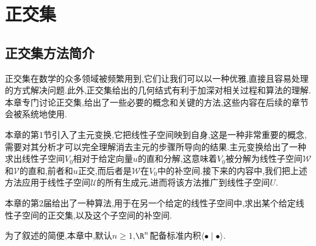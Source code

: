 \chapter{正交集}

\section{正交集方法简介}

正交集在数学的众多领域被频繁用到,它们让我们可以以一种优雅,直接且容易处理的方式解决问题.此外,正交集给出的几何结式有利于加深对相关过程和算法的理解.本章专门讨论正交集,给出了一些必要的概念和关键的方法,这些内容在后续的章节会被系统地使用.

本章的第1节引入了主元变换,它把线性子空间映到自身,这是一种非常重要的概念,需要对其分析才可以完全理解消去主元的步骤所导向的结果.主元变换给出了一种求出线性子空间$V_{0}$相对于给定向量$u$的直和分解,这意味着$V_{0}$被分解为线性子空间$\mathcal{W}$和$\mathcal{V}$的直和,前者和$u$正交,而后者是$\mathcal{W}$在$V_{0}$中的补空间.接下来的内容中,我们把上述方法应用于线性子空间$\mathcal{U}$的所有生成元,进而将该方法推广到线性子空间$U$.

本章的第2届给出了一种算法,用于在另一个给定的线性子空间中,求出某个给定线性子空间的正交集,以及这个子空间的补空间.

为了叙述的简便,本章中,默认$n\geq 1$,$\R^{n}$配备标准内积$\langle\bullet\mid\bullet\rangle$.